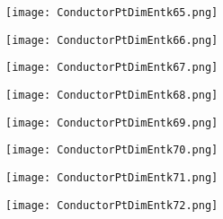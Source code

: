 \documentclass[pdf]{beamer}
\begin{document}
\begin{frame}
\begin{figure}[!h]
\centering
\texttt{[image: ConductorPtDimEntk65.png]}
\end{figure}
\end{frame}

\begin{frame}
\begin{figure}[!h]
\centering
\texttt{[image: ConductorPtDimEntk66.png]}
\end{figure}
\end{frame}

\begin{frame}
\begin{figure}[!h]
\centering
\texttt{[image: ConductorPtDimEntk67.png]}
\end{figure}
\end{frame}

\begin{frame}
\begin{figure}[!h]
\centering
\texttt{[image: ConductorPtDimEntk68.png]}
\end{figure}
\end{frame}

\begin{frame}
\begin{figure}[!h]
\centering
\texttt{[image: ConductorPtDimEntk69.png]}
\end{figure}
\end{frame}

\begin{frame}
\begin{figure}[!h]
\centering
\texttt{[image: ConductorPtDimEntk70.png]}
\end{figure}
\end{frame}

\begin{frame}
\begin{figure}[!h]
\centering
\texttt{[image: ConductorPtDimEntk71.png]}
\end{figure}
\end{frame}

\begin{frame}
\begin{figure}[!h]
\centering
\texttt{[image: ConductorPtDimEntk72.png]}
\end{figure}
\end{frame}
\end{document}
